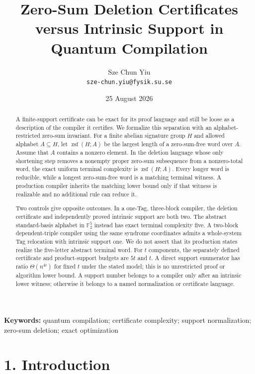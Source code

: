 \documentclass[
  11pt,
]{article}
\title{Zero-Sum Deletion Certificates versus Intrinsic Support in Quantum Compilation}
\author{Sze Chun Yiu\\\texttt{sze-chun.yiu@fysik.su.se}}
\date{25 August 2026}
\begin{document}
\maketitle

\begin{abstract}
A finite-support certificate can be exact for its proof language and
still be loose as a description of the compiler it certifies. We
formalize this separation with an alphabet-restricted zero-sum
invariant. For a finite abelian signature group \(H\) and allowed
alphabet \(A\subseteq H\), let \(\operatorname{zsf}(H; A)\) be the
largest length of a zero-sum-free word over \(A\). Assume that \(A\)
contains a nonzero element. In the deletion language whose only
shortening step removes a nonempty proper zero-sum subsequence from a
nonzero-total word, the exact uniform terminal complexity is
\(\operatorname{zsf}(H; A)\). Every longer word is reducible, while a
longest zero-sum-free word is a matching terminal witness. A production
compiler inherits the matching lower bound only if that witness is
realizable and no additional rule can reduce it.

Two controls give opposite outcomes. In a one-Tag, three-block compiler,
the deletion certificate and independently proved intrinsic support are
both two. The abstract standard-basis alphabet in \(\mathbb F_2^5\)
instead has exact terminal complexity five. A two-block dependent-triple
compiler using the same syndrome coordinates admits a whole-system Tag
relocation with intrinsic support one. We do not assert that its
production states realize the five-letter abstract terminal word. For
\(t\) components, the separately defined certificate and product-support
budgets are \(5t\) and \(t\). A direct support enumerator has ratio
\(\Theta(n^{4t})\) for fixed \(t\) under the stated model; this is no
unrestricted proof or algorithm lower bound. A support number belongs to
a compiler only after an intrinsic lower witness; otherwise it belongs
to a named normalization or certificate language.

\end{abstract}

\noindent\textbf{Keywords:} quantum compilation; certificate complexity; support
normalization; zero-sum deletion; exact optimization

\hypertarget{introduction}{%
\section{1. Introduction}\label{introduction}}
\end{document}

